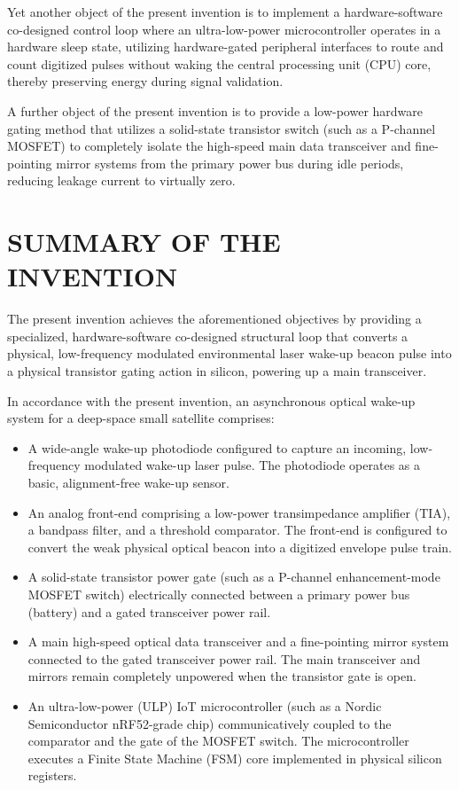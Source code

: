 \documentclass[12pt,a4paper]{article}
\begin{document}
Yet another object of the present invention is to implement a hardware-software co-designed control loop where an ultra-low-power microcontroller operates in a hardware sleep state, utilizing hardware-gated peripheral interfaces to route and count digitized pulses without waking the central processing unit (CPU) core, thereby preserving energy during signal validation.

A further object of the present invention is to provide a low-power hardware gating method that utilizes a solid-state transistor switch (such as a P-channel MOSFET) to completely isolate the high-speed main data transceiver and fine-pointing mirror systems from the primary power bus during idle periods, reducing leakage current to virtually zero.

\section*{SUMMARY OF THE INVENTION}
The present invention achieves the aforementioned objectives by providing a specialized, hardware-software co-designed structural loop that converts a physical, low-frequency modulated environmental laser wake-up beacon pulse into a physical transistor gating action in silicon, powering up a main transceiver.

In accordance with the present invention, an asynchronous optical wake-up system for a deep-space small satellite comprises:
\begin{itemize}
    \item A wide-angle wake-up photodiode configured to capture an incoming, low-frequency modulated wake-up laser pulse. The photodiode operates as a basic, alignment-free wake-up sensor.
    \item An analog front-end comprising a low-power transimpedance amplifier (TIA), a bandpass filter, and a threshold comparator. The front-end is configured to convert the weak physical optical beacon into a digitized envelope pulse train.
    \item A solid-state transistor power gate (such as a P-channel enhancement-mode MOSFET switch) electrically connected between a primary power bus (battery) and a gated transceiver power rail.
    \item A main high-speed optical data transceiver and a fine-pointing mirror system connected to the gated transceiver power rail. The main transceiver and mirrors remain completely unpowered when the transistor gate is open.
    \item An ultra-low-power (ULP) IoT microcontroller (such as a Nordic Semiconductor nRF52-grade chip) communicatively coupled to the comparator and the gate of the MOSFET switch. The microcontroller executes a Finite State Machine (FSM) core implemented in physical silicon registers.
\end{itemize}
\end{document}
